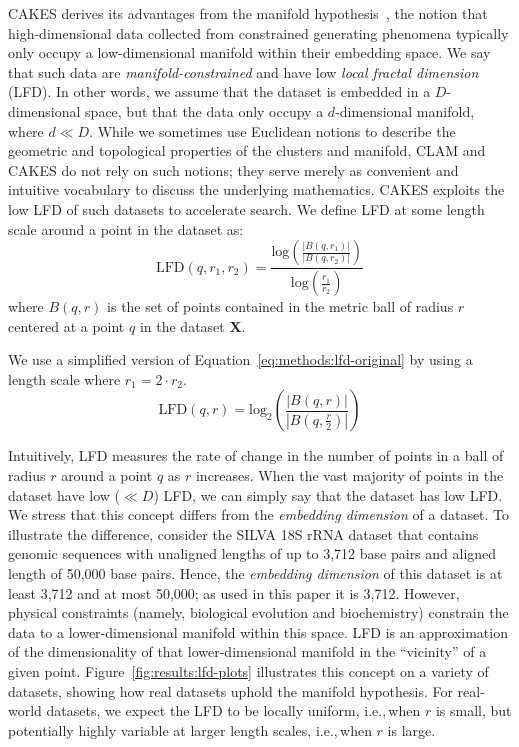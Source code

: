 CAKES derives its advantages from the manifold hypothesis~\cite{fefferman2016testing}, the notion that high-dimensional data collected from constrained generating phenomena typically only occupy a low-dimensional manifold within their embedding space.
We say that such data are \textit{manifold-constrained} and have low \textit{local fractal dimension} (LFD).
In other words, we assume that the dataset is embedded in a $D$-dimensional space, but that the data only occupy a $d$-dimensional manifold, where $d \ll D$.
While we sometimes use Euclidean notions to describe the geometric and topological properties of the clusters and manifold, CLAM and CAKES do not rely on such notions;
they serve merely as convenient and intuitive vocabulary to discuss the underlying mathematics.
CAKES exploits the low LFD of such datasets to accelerate search.
We define LFD at some length scale around a point in the dataset as:
\begin{equation}
    \text{LFD}(q, r_1, r_2) = \frac{\text{log} \left( \frac{|B(q, r_1)|}{|B(q, r_2)|} \right) }{\text{log} \left( \frac{r_1}{r_2} \right) }
    \label{eq:methods:lfd-original}
\end{equation}
where $B(q, r)$ is the set of points contained in the metric ball of radius $r$ centered at a point $q$ in the dataset $\textbf{X}$.

We use a simplified version of Equation~\ref{eq:methods:lfd-original} by using a length scale where $r_1 = 2 \cdot r_2$.
\begin{equation}
    \text{LFD}(q, r) = \text{log}_2 \left( \frac{|B(q, r)|}{|B(q, \frac{r}{2})|} \right)
    \label{eq:methods:lfd-half}
\end{equation}

Intuitively, LFD measures the rate of change in the number of points in a ball of radius $r$ around a point $q$ as $r$ increases. When the vast majority of points in the dataset have low ($\ll D$) LFD, we can simply say that the dataset has low LFD.
We stress that this concept differs from the \textit{embedding dimension} of a dataset.
To illustrate the difference, consider the SILVA 18S rRNA dataset that contains genomic sequences with unaligned lengths of up to 3,712 base pairs and aligned length of 50,000 base pairs.
Hence, the \textit{embedding dimension} of this dataset is at least 3,712 and at most 50,000; as used in this paper it is 3,712.
However, physical constraints (namely, biological evolution and biochemistry) constrain the data to a lower-dimensional manifold within this space.
LFD is an approximation of the dimensionality of that lower-dimensional manifold in the ``vicinity'' of a given point.
Figure~\ref{fig:results:lfd-plots} illustrates this concept on a variety of datasets, showing how real datasets uphold the manifold hypothesis.
For real-world datasets, we expect the LFD to be locally uniform, i.e.,\,when $r$ is small, but potentially highly variable at larger length scales, i.e.,\,when $r$ is large.


